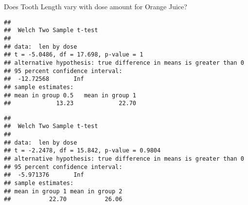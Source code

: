\documentclass[
]{article}
\newenvironment{Shaded}{\begin{snugshade}}{\end{snugshade}}
\newcommand{\AttributeTok}[1]{\textcolor[rgb]{0.77,0.63,0.00}{#1}}
\newcommand{\CommentTok}[1]{\textcolor[rgb]{0.56,0.35,0.01}{\textit{#1}}}
\newcommand{\ConstantTok}[1]{\textcolor[rgb]{0.00,0.00,0.00}{#1}}
\newcommand{\FloatTok}[1]{\textcolor[rgb]{0.00,0.00,0.81}{#1}}
\newcommand{\FunctionTok}[1]{\textcolor[rgb]{0.00,0.00,0.00}{#1}}
\newcommand{\NormalTok}[1]{#1}
\newcommand{\OtherTok}[1]{\textcolor[rgb]{0.56,0.35,0.01}{#1}}
\newcommand{\SpecialCharTok}[1]{\textcolor[rgb]{0.00,0.00,0.00}{#1}}
\newcommand{\StringTok}[1]{\textcolor[rgb]{0.31,0.60,0.02}{#1}}
\begin{document}
Does Tooth Length vary with dose amount for Orange Juice?

\begin{Shaded}
\end{Shaded}

\begin{verbatim}
## 
##  Welch Two Sample t-test
## 
## data:  len by dose
## t = -5.0486, df = 17.698, p-value = 1
## alternative hypothesis: true difference in means is greater than 0
## 95 percent confidence interval:
##  -12.72568       Inf
## sample estimates:
## mean in group 0.5   mean in group 1 
##             13.23             22.70
\end{verbatim}

\begin{Shaded}
\end{Shaded}

\begin{verbatim}
## 
##  Welch Two Sample t-test
## 
## data:  len by dose
## t = -2.2478, df = 15.842, p-value = 0.9804
## alternative hypothesis: true difference in means is greater than 0
## 95 percent confidence interval:
##  -5.971376       Inf
## sample estimates:
## mean in group 1 mean in group 2 
##           22.70           26.06
\end{verbatim}
\end{document}
